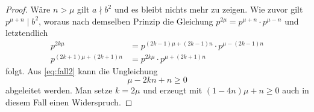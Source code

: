 \begin{proof}
Wäre $n > \mu$ gilt $a \nmid b^2$ und es bleibt nichts mehr zu zeigen.
Wie zuvor gilt $p^{\mu + n} \mid b^2$,
woraus nach demselben Prinzip die Gleichung
$p^{2\mu} = p^{\mu + n} \cdot p^{\mu - n}$
und letztendlich
\begin{align*}
\label{eq:fall2} \tag{$**$}
p^{2k\mu} & = p^{(2k - 1)\mu + (2k - 1)n} \cdot p^{\mu - (2k - 1)n} \\
p^{(2k + 1)\mu + (2k + 1)n} & = p^{2k\mu} \cdot p^{\mu + (2k + 1)n}
\end{align*}
folgt. Aus \eqref{eq:fall2} kann die Ungleichung
\begin{equation*}
\mu - 2kn + n \geq 0
\end{equation*}
abgeleitet werden. Man setze $k = 2\mu$ und erzeugt mit
$(1 - 4n)\mu + n \geq 0$ auch in diesem Fall einen Widerspruch.
\end{proof}